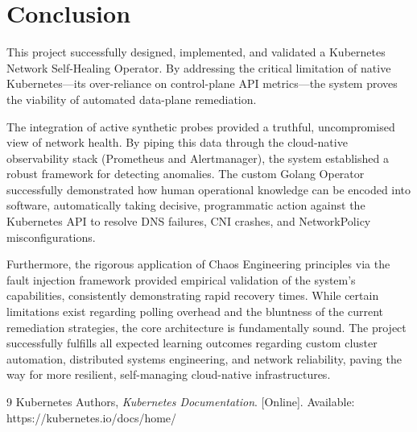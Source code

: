 \documentclass[12pt,a4paper]{article}
\begin{document}
\newpage

\section{Conclusion}
\onehalfspacing
This project successfully designed, implemented, and validated a Kubernetes Network Self-Healing Operator. By addressing the critical limitation of native Kubernetes—its over-reliance on control-plane API metrics—the system proves the viability of automated data-plane remediation.

The integration of active synthetic probes provided a truthful, uncompromised view of network health. By piping this data through the cloud-native observability stack (Prometheus and Alertmanager), the system established a robust framework for detecting anomalies. The custom Golang Operator successfully demonstrated how human operational knowledge can be encoded into software, automatically taking decisive, programmatic action against the Kubernetes API to resolve DNS failures, CNI crashes, and NetworkPolicy misconfigurations.

Furthermore, the rigorous application of Chaos Engineering principles via the fault injection framework provided empirical validation of the system's capabilities, consistently demonstrating rapid recovery times. While certain limitations exist regarding polling overhead and the bluntness of the current remediation strategies, the core architecture is fundamentally sound. The project successfully fulfills all expected learning outcomes regarding custom cluster automation, distributed systems engineering, and network reliability, paving the way for more resilient, self-managing cloud-native infrastructures.

\newpage
\begin{thebibliography}{9}
Kubernetes Authors, \textit{Kubernetes Documentation}. [Online]. Available: https://kubernetes.io/docs/home/
\end{thebibliography}
\end{document}
